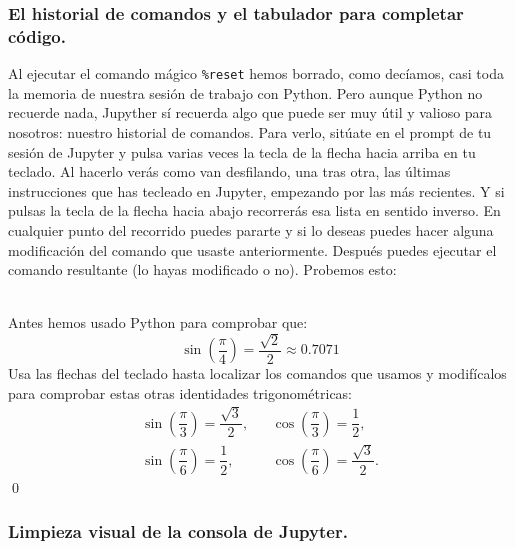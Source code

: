 \documentclass[10pt,a4paper]{article}\usepackage[]{graphicx}\usepackage[]{color}
\begin{document}
\subsubsection*{El historial de comandos y el tabulador para completar código.}
\label{tut02:subsubsec:historialComandosTabuladorCompletarCodigo}

Al ejecutar el comando mágico \verb#%reset#
hemos borrado, como decíamos, casi toda la memoria de nuestra sesión de trabajo con Python. Pero aunque Python no recuerde nada, Jupyther sí recuerda algo que puede ser muy útil y valioso para nosotros: nuestro {\sf historial de comandos}.  Para verlo, sitúate en el prompt de tu sesión de Jupyter y pulsa varias veces la tecla de la flecha hacia arriba en tu teclado. Al hacerlo verás como van desfilando, una tras otra, las últimas instrucciones que has tecleado en Jupyter, empezando por las más recientes.
Y si pulsas la tecla de la flecha hacia abajo recorrerás esa lista en sentido inverso. En cualquier punto del recorrido puedes pararte y si lo deseas puedes hacer alguna modificación del comando que usaste anteriormente. Después puedes ejecutar el comando resultante (lo hayas modificado o no). Probemos esto:
\begin{ejercicio}
\label{tut02:ejercicio07}
\quad\\
Antes hemos usado Python para comprobar que:
$$\sin\left(\dfrac{\pi}{4}\right) = \dfrac{\sqrt{2}}{2}\approx 0.7071$$
Usa las flechas del teclado hasta localizar los comandos que usamos y modifícalos para comprobar estas otras identidades trigonométricas:
\[
\begin{array}{lll}
\sin\left(\dfrac{\pi}{3}\right) = \dfrac{\sqrt{3}}{2},&&
\cos\left(\dfrac{\pi}{3}\right) = \dfrac{1}{2},\\[3mm]
\sin\left(\dfrac{\pi}{6}\right) = \dfrac{1}{2},&&
\cos\left(\dfrac{\pi}{6}\right) = \dfrac{\sqrt{3}}{2}.
\end{array}
\]
\qed
\end{ejercicio}

\subsubsection*{Limpieza visual de la consola de Jupyter.}
\label{tut02:subsubsec:limpiezaVisualConsolaJupyter}
\end{document}
